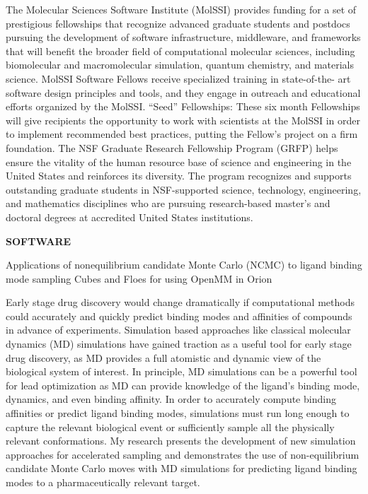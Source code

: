 {  
  {The Molecular Sciences Software Institute (MolSSI) provides funding for a set of prestigious fellowships that recognize advanced graduate students and postdocs pursuing the development of software infrastructure, middleware, and frameworks that will benefit the broader field of computational molecular sciences, including biomolecular and macromolecular simulation, quantum chemistry, and materials science. MolSSI Software Fellows receive specialized training in state-of-the- art software design principles and tools, and they engage in outreach and educational efforts organized by the MolSSI.}
  {“Seed” Fellowships: These six month Fellowships will give recipients the opportunity to work with scientists at the MolSSI in order to implement recommended best practices, putting the Fellow’s project on a firm foundation.}
  {The NSF Graduate Research Fellowship Program (GRFP) helps ensure the vitality of the human resource base of science and engineering in the United States and reinforces its diversity. The program recognizes and supports outstanding graduate students in NSF-supported science, technology, engineering, and mathematics disciplines who are pursuing research-based master's and doctoral degrees at accredited United States institutions.}
  
\vspace{12pt}
\textbf{SOFTWARE}

  {Applications of nonequilibrium candidate Monte Carlo (NCMC) to ligand binding mode sampling}
  {Cubes and Floes for using OpenMM in Orion}
  

}

\thesisabstract
{Early stage drug discovery would change dramatically if computational methods could accurately and quickly predict binding modes and affinities of compounds in advance of experiments.
Simulation based approaches like classical molecular dynamics (MD) simulations have gained traction as a useful tool for early stage drug discovery, as MD provides a full atomistic and dynamic view of the biological system of interest.
In principle, MD simulations can be a powerful tool for lead optimization as MD can provide knowledge of the ligand's binding mode, dynamics, and even binding affinity.
In order to accurately compute binding affinities or predict ligand binding modes, simulations must run long enough to capture the relevant biological event or sufficiently sample all the physically relevant conformations.
My research presents the development of new simulation approaches for accelerated sampling and demonstrates the use of non-equilibrium candidate Monte Carlo moves with MD simulations for predicting ligand binding modes to a pharmaceutically relevant target.
}

